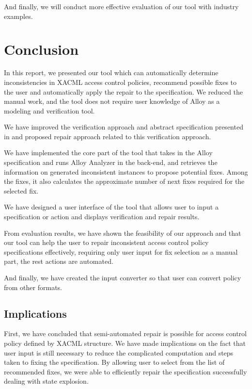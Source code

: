 \documentclass[letterpaper]{acm_proc_article-sp}
\begin{document}
And finally, we will conduct more effective evaluation of our tool with industry examples.

\section{Conclusion}

In this report, we presented our tool which can automatically determine inconsistencies in XACML access control policies, recommend possible fixes to the user and automatically apply the repair to the specification. We reduced the manual work, and the tool does not require user knowledge of Alloy as a modeling and verification tool.

We have improved the verification approach and abstract specification presented in \cite{acp:alloy} and proposed repair approach related to this verification approach.

We have implemented the core part of the tool that takes in the Alloy specification and runs Alloy Analyzer in the back-end, and retrieves the information on generated inconsistent instances to propose potential fixes. Among the fixes, it also calculates the approximate number of next fixes required for the selected fix. 

We have designed a user interface of the tool that allows user to input a specification or action and displays verification and repair results. 

From evaluation results, we have shown the feasibility of our approach and that our tool can help the user to repair inconsistent access control policy specifications effectively, requiring only user input for fix selection as a manual part, the rest actions are automated. 

And finally, we have created the input converter so that user can convert policy from other formats. 

\subsection{Implications}

First, we have concluded that semi-automated repair is possible for access control policy defined by XACML structure. 
We have made implications on the fact that user input is still necessary to reduce the complicated computation and steps taken to fixing the specification. By allowing user to select from the list of recommended fixes, we were able to efficiently repair the specification successfully dealing with state explosion.
\end{document}
